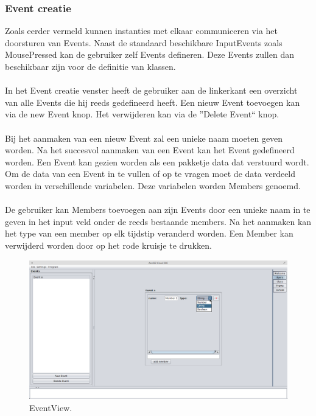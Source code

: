 \documentclass[]{article}
\begin{document}
\subsubsection{Event creatie}
Zoals eerder vermeld kunnen instanties met elkaar communiceren via het doorsturen van Events. Naast de standaard beschikbare InputEvents zoals MousePressed kan de gebruiker zelf Events defineren. Deze Events zullen dan beschikbaar zijn voor de definitie van klassen.\\\\
In het Event creatie venster heeft de gebruiker aan de linkerkant een overzicht van alle Events die hij reeds gedefineerd heeft. Een nieuw Event toevoegen kan via de new Event knop. Het verwijderen kan via de ''Delete Event`` knop.\\\\
Bij het aanmaken van een nieuw Event zal een unieke naam moeten geven worden. Na het succesvol aanmaken van een Event kan het Event gedefineerd worden. Een Event kan gezien worden als een pakketje data dat verstuurd wordt. Om de data van een Event in te vullen of op te vragen moet de data verdeeld worden in verschillende variabelen. Deze variabelen worden Members genoemd.\\\\
De gebruiker kan Members toevoegen aan zijn Events door een unieke naam in te geven in het input veld onder de reeds bestaande members. Na het aanmaken kan het type van een member op elk tijdstip veranderd worden. Een Member kan verwijderd worden door op het rode kruisje te drukken.
\begin{figure}[H]
  \centering
\includegraphics[scale=0.2]{Documentatie/images/EventView}
  \caption{EventView.} \label{EventView}
\end{figure}
\end{document}
